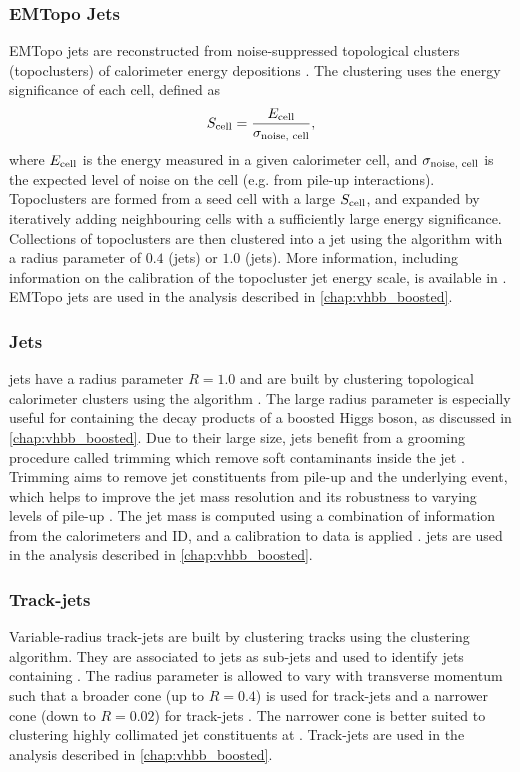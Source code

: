 \subsubsection{EMTopo Jets}
EMTopo jets are reconstructed from noise-suppressed topological clusters (topoclusters) of calorimeter energy depositions \cite{PERF-2014-07}.
The clustering uses the energy significance of each cell, defined as 
%
\begin{equation}
  S_\textnormal{cell} = \frac{E_\textnormal{cell}}{\sigma_\textnormal{noise, cell}} ,
\end{equation}
%
where $E_\textnormal{cell}$ is the energy measured in a given calorimeter cell, and $\sigma_\textnormal{noise, cell}$ is the expected level of noise on the cell (e.g. from pile-up interactions).
Topoclusters are formed from a seed cell with a large $S_\textnormal{cell}$, and expanded by iteratively adding neighbouring cells with a sufficiently large energy significance.
Collections of topoclusters are then clustered into a jet 
using the \antikt algorithm with a radius parameter of $0.4$ (\smallR jets) or $1.0$ (\largeR jets).
More information, including information on the calibration of the topocluster jet energy scale, is available in .
EMTopo jets are used in the analysis described in \cref{chap:vhbb_boosted}.

\subsubsection{\texorpdfstring{\LargeR}{Large-R} Jets}
\LargeR jets have a radius parameter $R=1.0$ and are built by clustering topological calorimeter clusters using the \antikt algorithm \cite{Butterworth:2008iy}.
The large radius parameter is especially useful for containing the decay products of a boosted Higgs boson, as discussed in \cref{chap:vhbb_boosted}. 
Due to their large size, \largeR jets benefit from a grooming procedure called trimming which remove soft contaminants inside the jet \cite{Krohn:2009th,PERF-2012-02}.
Trimming aims to remove jet constituents from pile-up and the underlying event, which helps to improve the jet mass resolution and its robustness to varying levels of pile-up \cite{Ellis:1993tq}.
The jet mass is computed using a combination of information from the calorimeters and ID, and a calibration to data is applied \cite{JETM-2018-02}.
\LargeR jets are used in the analysis described in \cref{chap:vhbb_boosted}.

\subsubsection{Track-jets}
Variable-radius track-jets are built by clustering tracks using the \antikt clustering algorithm.
They are associated to \largeR jets as sub-jets and used to identify \largeR jets containing \bhadrons.
The radius parameter is allowed to vary with transverse momentum such that a broader cone (up to $R=0.4$) is used for \lowpt track-jets and a narrower cone (down to $R=0.02$) for \highpt track-jets \cite{Krohn:2009zg,ATL-PHYS-PUB-2017-010}.
The narrower cone is better suited to clustering highly collimated jet constituents at \highpt.
Track-jets are used in the analysis described in \cref{chap:vhbb_boosted}.

